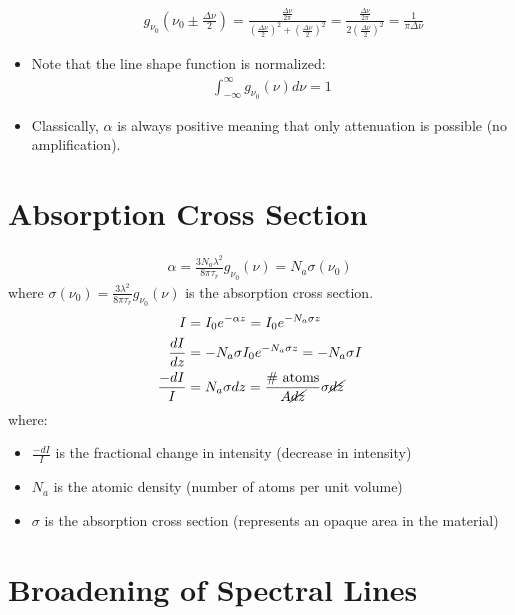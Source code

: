 \documentclass[11pt]{article}
\begin{document}
\begin{itemize}
\begin{itemize}
\begin{align*}
                    g_{\nu_0}(\nu_0 \pm \frac{\Delta \nu}{2}) = \frac{\frac{\Delta \nu}{2 \pi}}{(\frac{\Delta \nu}{2})^2 + (\frac{\Delta \nu}{2})^2} = \frac{\frac{\Delta \nu}{2 \pi}}{2(\frac{\Delta \nu}{2})^2} = \frac{1}{\pi \Delta \nu}
                \end{align*}
        \end{itemize}
    \item Note that the line shape function is normalized:
        \begin{align*}
            \int_{-\infty}^{\infty} g_{\nu_0}(\nu) d\nu = 1
        \end{align*}
    \item Classically, $\alpha$ is always positive meaning that only attenuation is possible (no amplification).
\end{itemize}

\section{Absorption Cross Section}
\begin{align*}
    \alpha = \frac{3 N_a \lambda^2}{8 \pi \tau_r} g_{\nu_0}(\nu) = N_a \sigma(\nu_0) 
\end{align*}
where $\sigma(\nu_0) = \frac{3 \lambda^2}{8 \pi \tau_r} g_{\nu_0}(\nu)$ is the absorption cross section. 
\begin{align*}
    I &= I_0 e^{-\alpha z} = I_0 e^{-N_a \sigma z} \\
    \frac{dI}{dz} &= -N_a \sigma I_0 e^{-N_a \sigma z} = -N_a \sigma I \\
    \frac{-dI}{I} &= N_a \sigma dz = \frac{\text{\# atoms}}{A \cancel{dz}} \sigma \cancel{dz} \\
\end{align*}
where:
\begin{itemize}
    \item $\frac{-dI}{I}$ is the fractional change in intensity (decrease in intensity)
    \item $N_a$ is the atomic density (number of atoms per unit volume)
    \item $\sigma$ is the absorption cross section (represents an opaque area in the material)
\end{itemize}

\section{Broadening of Spectral Lines}
\end{document}
